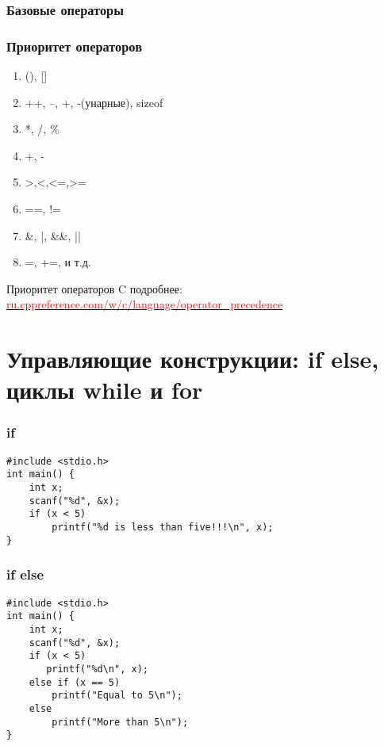 \documentclass[12pt,pdf,hyperref={unicode}]{beamer}
\begin{document}
\begin{frame}
\frametitle{Базовые операторы}
\frametitle{Приоритет операторов}
\begin{center}
\begin{enumerate}
\item (), []
\item ++, --, +, -(унарные), sizeof
\item *, /, \%
\item +, -
\item >,<,<=,>=
\item ==, !=
\item \&, |, \&\&, ||
\item =, +=, и т.д.
\end{enumerate}
\end{center}
Приоритет операторов C подробнее:\\
\href{http://ru.cppreference.com/w/c/language/operator_precedence}
{\textcolor{red}{ru.cppreference.com/w/c/language/operator\_precedence}}
\end{frame}







\section{Управляющие конструкции: if else, циклы while и for}


\begin{frame}[fragile]
\frametitle{if} 



\begin{lstlisting}
#include <stdio.h>
int main() {
    int x;
    scanf("%d", &x);
    if (x < 5)
        printf("%d is less than five!!!\n", x);
}
\end{lstlisting}



\end{frame}

\begin{frame}[fragile]
\frametitle{if else}

\begin{lstlisting}
#include <stdio.h>
int main() {
    int x;
    scanf("%d", &x);
    if (x < 5)
       printf("%d\n", x);
    else if (x == 5)
        printf("Equal to 5\n");
    else
        printf("More than 5\n");
}
\end{lstlisting}
\end{frame}
\end{document}
